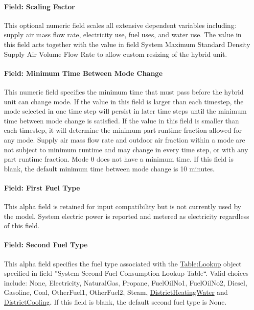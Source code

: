 \paragraph{Field: Scaling Factor}
This optional numeric field scales all extensive dependent variables including: supply air mass flow rate, electricity use, fuel uses, and water use. The value in this field acts together with the value in field System Maximum Standard Density Supply Air Volume Flow Rate to allow custom resizing of the hybrid unit.

\paragraph{Field: Minimum Time Between Mode Change}
This numeric field specifies the minimum time that must pass before the hybrid unit can change mode. If the value in this field is larger than each timestep, the mode selected in one time step will persist in later time steps until the minimum time between mode change is satisfied. If the value in this field is smaller than each timestep, it will determine the minimum part runtime fraction allowed for any mode. Supply air mass flow rate and outdoor air fraction within a mode are not subject to minimum runtime and may change in every time step, or with any part runtime fraction. Mode 0 does not have a minimum time. If this field is blank, the default minimum time between mode change is 10 minutes.

\paragraph{Field: First Fuel Type}
This alpha field is retained for input compatibility but is not currently used by the model. System electric power is reported and metered as electricity regardless of this field.

\paragraph{Field: Second Fuel Type}
This alpha field specifies the fuel type associated with the \hyperref[tablelookup]{Table:Lookup} object specified in field ''System Second Fuel Consumption Lookup Table``. Valid choices include: None, Electricity, NaturalGas, Propane, FuelOilNo1, FuelOilNo2, Diesel, Gasoline, Coal, OtherFuel1, OtherFuel2, Steam, \hyperref[districtheating]{DistrictHeatingWater} and \hyperref[districtcooling]{DistrictCooling}. If this field is blank, the default second fuel type is None.

